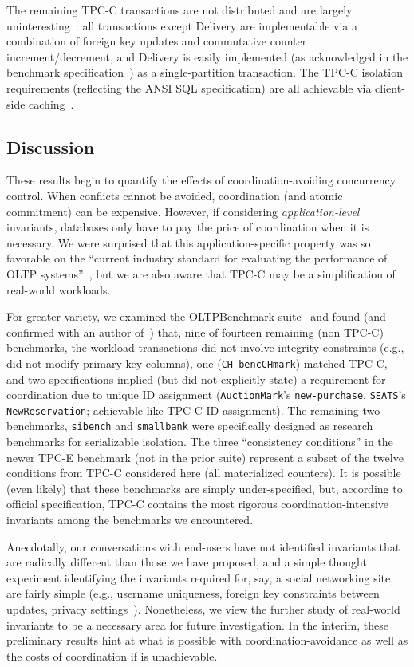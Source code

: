  The remaining TPC-C transactions
are not distributed and are largely uninteresting~\cite{calvin}: all
transactions except Delivery are implementable via a combination of
foreign key updates and commutative counter increment/decrement, and
Delivery is easily implemented (as acknowledged in the benchmark
specification~\cite{tpcc}) as a single-partition transaction. The
TPC-C isolation requirements (reflecting the ANSI SQL specification)
are all achievable via client-side caching~\cite{hat-vldb}.

\subsection{Discussion}

These results begin to quantify the effects of coordination-avoiding
concurrency control. When conflicts cannot be avoided, coordination
(and atomic commitment) can be expensive. However, if considering
\textit{application-level} invariants, databases only have to pay the
price of coordination when it is necessary. We were surprised that
this application-specific property was so favorable on the ``current
industry standard for evaluating the performance of OLTP
systems''~\cite{oltpbench}, but we are also aware that TPC-C may be a
simplification of real-world workloads.

For greater variety, we examined the OLTPBenchmark
suite~\cite{oltpbench} and found (and confirmed with an author
of~\cite{oltpbench}) that, nine of fourteen remaining (non TPC-C)
benchmarks, the workload transactions did not involve integrity
constraints (e.g., did not modify primary key columns), one
(\texttt{CH-bencCHmark}) matched TPC-C, and two specifications implied
(but did not explicitly state) a requirement for coordination due to
unique ID assignment (\texttt{AuctionMark}'s \texttt{new-purchase},
\texttt{SEATS}'s \texttt{NewReservation}; achievable like TPC-C ID
assignment). The remaining two benchmarks, \texttt{sibench} and
\texttt{smallbank} were specifically designed as research benchmarks
for serializable isolation. The three ``consistency conditions'' in
the newer TPC-E benchmark (not in the prior suite) represent a subset
of the twelve conditions from TPC-C considered here (all materialized
counters). It is possible (even likely) that these benchmarks are
simply under-specified, but, according to official specification,
TPC-C contains the most rigorous coordination-intensive invariants
among the benchmarks we encountered.

Anecdotally, our conversations with end-users have not identified
invariants that are radically different than those we have proposed,
and a simple thought experiment identifying the invariants required
for, say, a social networking site, are fairly simple (e.g., username
uniqueness, foreign key constraints between updates, privacy
settings~\cite{pnuts}). Nonetheless, we view the further study of
real-world invariants to be a necessary area for future
investigation. In the interim, these preliminary results hint at what
is possible with coordination-avoidance as well as the costs of
coordination if \cfreedom is unachievable.


